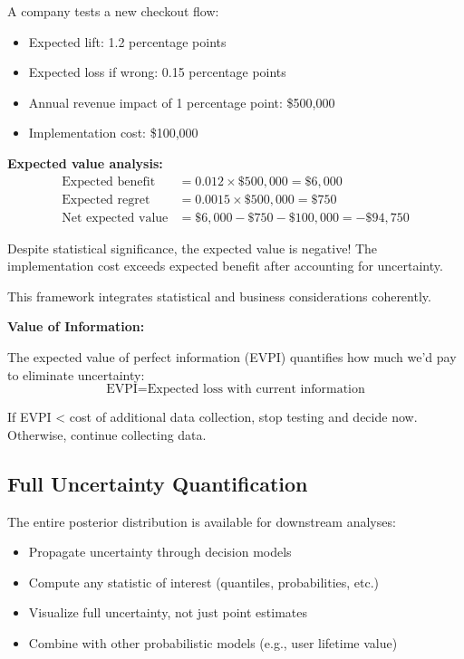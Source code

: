 \begin{example}
A company tests a new checkout flow:
\begin{itemize}
    \item Expected lift: 1.2 percentage points
    \item Expected loss if wrong: 0.15 percentage points
    \item Annual revenue impact of 1 percentage point: \$500,000
    \item Implementation cost: \$100,000
\end{itemize}

\textbf{Expected value analysis:}
\begin{align}
\text{Expected benefit} &= 0.012 \times \$500{,}000 = \$6{,}000 \\
\text{Expected regret} &= 0.0015 \times \$500{,}000 = \$750 \\
\text{Net expected value} &= \$6{,}000 - \$750 - \$100{,}000 = -\$94{,}750
\end{align}

Despite statistical significance, the expected value is negative! The implementation cost exceeds expected benefit after accounting for uncertainty.

This framework integrates statistical and business considerations coherently.
\end{example}

\textbf{Value of Information:}

The expected value of perfect information (EVPI) quantifies how much we'd pay to eliminate uncertainty:
\begin{equation}
\text{EVPI} = \text{Expected loss with current information}
\end{equation}

If EVPI < cost of additional data collection, stop testing and decide now. Otherwise, continue collecting data.

\subsection{Full Uncertainty Quantification}

The entire posterior distribution is available for downstream analyses:
\begin{itemize}
    \item Propagate uncertainty through decision models
    \item Compute any statistic of interest (quantiles, probabilities, etc.)
    \item Visualize full uncertainty, not just point estimates
    \item Combine with other probabilistic models (e.g., user lifetime value)
\end{itemize}

